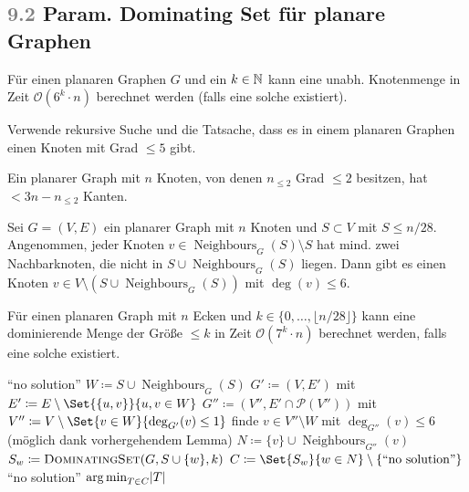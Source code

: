 \documentclass{cheat-sheet}
\newcommand{\size}[1]{\abs{#1}} %
\DeclareMathOperator*{\argmin}{arg\,min}
\newcommand{\Powerset}{\mathcal{P}} %
\renewcommand{\O}{\mathcal{O}} %
\newcommand{\floor}[1]{\lfloor #1 \rfloor} %
\DeclareMathOperator{\Neighbours}{Neighbours} %
\newcommand{\IndentState}[1]{\State \quad #1}
\newcommand{\Problem}[1]{\textcolor{ProblemColor}{\textbf{#1}}}
\newcommand{\scriptSection}[1]{\textcolor{gray}{#1}\enspace}
\begin{document}
\subsection{\scriptSection{9.2} Param. \Problem{Dominating Set} für planare Graphen}

\begin{satz}
  Für einen planaren Graphen $G$ und ein $k \in \mathbb{N}$ kann eine unabh. Knotenmenge in Zeit $\O(6^k \cdot n)$ berechnet werden (falls eine solche existiert).
\end{satz}

\begin{idee}
  Verwende rekursive Suche und die Tatsache, dass es in einem planaren Graphen einen Knoten mit Grad $\leq 5$ gibt.
\end{idee}

\begin{lem}
  Ein planarer Graph mit $n$ Knoten, von denen $n_{\leq 2}$ Grad $\leq 2$ besitzen, hat $< 3 n - n_{\leq 2}$ Kanten.
\end{lem}

\begin{lem}
  Sei $G = (V, E)$ ein planarer Graph mit $n$ Knoten und $S \subset V$ mit $S \leq n/28$.
  Angenommen, jeder Knoten $v \in \Neighbours_G(S) \setminus S$ hat mind. zwei Nachbarknoten, die nicht in $S \cup \Neighbours_G(S)$ liegen.
  Dann gibt es einen Knoten $v \in V \setminus (S \cup \Neighbours_G(S))$ mit $\deg(v) \leq 6$.
\end{lem}

\begin{satz}
  Für einen planaren Graph mit $n$ Ecken und $k \in \{ 0, \ldots, \floor{n / 28} \}$ kann eine dominierende Menge der Größe $\leq k$ in Zeit $\O(7^k \cdot n)$ berechnet werden, falls eine solche existiert.
\end{satz}

\begin{algorithmic}
    \If{$\size{S} > k$} \Return ``no solution'' \EndIf
    \State $W \coloneqq S \cup \Neighbours_G(S)$
    \State $G' \coloneqq (V, E')$ mit $E' \coloneqq E \setminus \Set{\{ u, v \}}{u, v \in W}$
    \State $G'' \coloneqq (V'', E' \cap \Powerset(V''))$ mit $V'' \coloneqq V \setminus \Set{v \in W}{\deg_{G'}(v) \leq 1}$
    \State finde $v \in V'' \setminus W$ mit $\deg_{G''}(v) \leq 6$
    \IndentState (möglich dank vorhergehendem Lemma)
    \State $N \coloneqq \{ v \} \cup \Neighbours_{G''}(v)$
      $S_w \coloneqq \Call{DominatingSet}{G, S \cup \{ w \}, k}$
    \EndFor
    \State $C \coloneqq \Set{S_w}{w \in N} \setminus \{ \text{``no solution''} \}$
     \Return ``no solution'' \EndIf
    \State \Return ${\argmin}_{T \in C} \size{T}$
  \EndFunction
\end{algorithmic}
\end{document}
